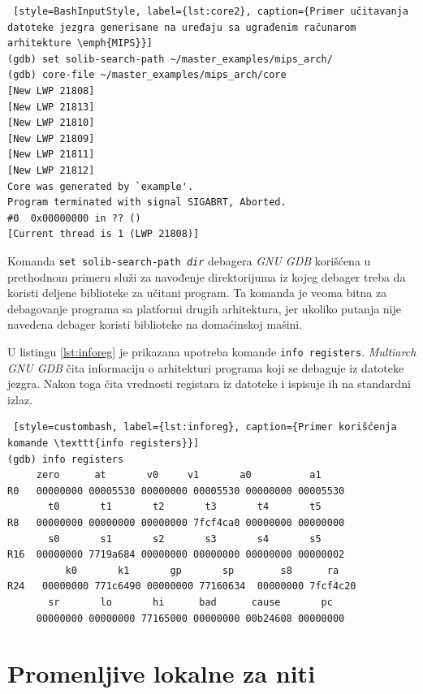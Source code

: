 \documentclass[12pt,oneside]{memoir}
\begin{document}
\begin{lstlisting} [style=BashInputStyle, label={lst:core2}, caption={Primer učitavanja datoteke jezgra generisane na uređaju sa ugrađenim računarom arhitekture \emph{MIPS}}]
(gdb) set solib-search-path ~/master_examples/mips_arch/
(gdb) core-file ~/master_examples/mips_arch/core
[New LWP 21808]
[New LWP 21813]
[New LWP 21810]
[New LWP 21809]
[New LWP 21811]
[New LWP 21812]
Core was generated by `example'.
Program terminated with signal SIGABRT, Aborted.
#0  0x00000000 in ?? ()
[Current thread is 1 (LWP 21808)]
\end{lstlisting}

Komanda \texttt{set solib-search-path \emph{dir}} debagera \emph{GNU GDB} korišćena u prethodnom primeru služi za navođenje direktorijuma iz kojeg debager treba da koristi deljene biblioteke za učitani program. Ta komanda je veoma bitna za debagovanje programa sa platformi drugih arhitektura, jer ukoliko putanja nije navedena debager koristi biblioteke na domaćinskoj mašini.

U listingu \ref{lst:inforeg} je prikazana upotreba komande \texttt{info registers}. \emph{Multiarch GNU GDB} čita informaciju o arhitekturi programa koji se debaguje iz datoteke jezgra. Nakon toga čita vrednosti registara iz datoteke i ispisuje ih na standardni izlaz.

\begin{lstlisting} [style=custombash, label={lst:inforeg}, caption={Primer korišćenja komande \texttt{info registers}}]
(gdb) info registers 
	 zero      at       v0     v1       a0	        a1       
R0   00000000 00005530 00000000 00005530 00000000 00005530
       t0       t1       t2       t3       t4       t5       
R8   00000000 00000000 00000000 7fcf4ca0 00000000 00000000
       s0       s1       s2       s3       s4       s5       
R16  00000000 7719a684 00000000 00000000 00000000 00000002
          k0       k1       gp       sp        s8      ra
R24   00000000 771c6490 00000000 77160634  00000000 7fcf4c20
       sr       lo       hi      bad      cause       pc
     00000000 00000000 77165000 00000000 00b24608 00000000
\end{lstlisting}

\chapter{Promenljive lokalne za niti}
\label{chp:TLS}
\end{document}
